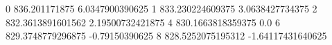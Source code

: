 0 836.201171875 6.0347900390625
1 833.230224609375 3.0638427734375
2 832.3613891601562 2.19500732421875
4 830.1663818359375 0.0
6 829.3748779296875 -0.79150390625
8 828.5252075195312 -1.64117431640625
